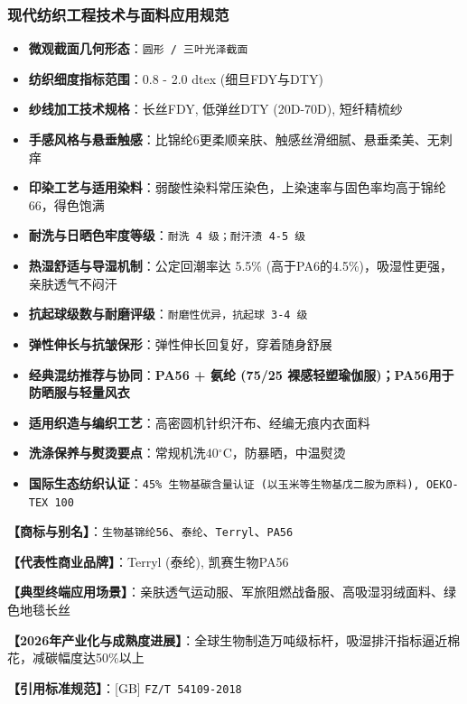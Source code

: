 \documentclass[11pt,openright,twoside,UTF8]{ctexbook}
\begin{document}
\subsubsection*{现代纺织工程技术与面料应用规范}
\begin{itemize} \setlength{\itemsep}{2pt}
    \item \textbf{微观截面几何形态}：\texttt{圆形 / 三叶光泽截面}
    \item \textbf{纺织细度指标范围}：0.8 - 2.0 dtex (细旦FDY与DTY)
    \item \textbf{纱线加工技术规格}：长丝FDY, 低弹丝DTY (20D-70D), 短纤精梳纱
    \item \textbf{手感风格与悬垂触感}：比锦纶6更柔顺亲肤、触感丝滑细腻、悬垂柔美、无刺痒
    \item \textbf{印染工艺与适用染料}：弱酸性染料常压染色，上染速率与固色率均高于锦纶66，得色饱满
    \item \textbf{耐洗与日晒色牢度等级}：\texttt{耐洗 4 级；耐汗渍 4-5 级}
    \item \textbf{热湿舒适与导湿机制}：公定回潮率达 5.5\% (高于PA6的4.5\%)，吸湿性更强，亲肤透气不闷汗
    \item \textbf{抗起球级数与耐磨评级}：\texttt{耐磨性优异，抗起球 3-4 级}
    \item \textbf{弹性伸长与抗皱保形}：弹性伸长回复好，穿着随身舒展
    \item \textbf{经典混纺推荐与协同}：\textbf{PA56 + 氨纶 (75/25 裸感轻塑瑜伽服)；PA56用于防晒服与轻量风衣}
    \item \textbf{适用织造与编织工艺}：高密圆机针织汗布、经编无痕内衣面料
    \item \textbf{洗涤保养与熨烫要点}：常规机洗40$^\circ\mathrm{C}$，防暴晒，中温熨烫
    \item \textbf{国际生态纺织认证}：\texttt{45\% 生物基碳含量认证 (以玉米等生物基戊二胺为原料), OEKO-TEX 100}
\end{itemize}
\vspace{0.2cm}

\noindent\textbf{【商标与别名】}：\texttt{生物基锦纶56}、\texttt{泰纶}、\texttt{Terryl}、\texttt{PA56}\par
\noindent\textbf{【代表性商业品牌】}：Terryl (泰纶), 凯赛生物PA56\par
\noindent\textbf{【典型终端应用场景】}：亲肤透气运动服、军旅阻燃战备服、高吸湿羽绒面料、绿色地毯长丝\par
\noindent\textbf{【2026年产业化与成熟度进展】}：全球生物制造万吨级标杆，吸湿排汗指标逼近棉花，减碳幅度达50\%以上\par
\noindent\textbf{【引用标准规范】}：[GB] \texttt{FZ/T 54109-2018}\par
\vspace{0.5cm}
\end{document}
